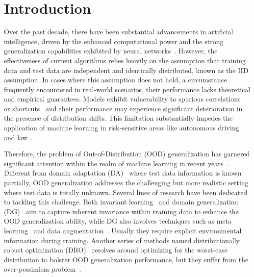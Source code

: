 \section{Introduction}

Over the past decade, there have been substantial advancements in artificial intelligence, driven by the enhanced computational power and the strong generalization capabilities exhibited by neural networks~\cite{he2016deep, brown2020language}. 
However, the effectiveness of current algorithms relies heavily on the assumption that training data and test data are independent and identically distributed, known as the IID assumption. In cases where this assumption does not hold, a circumstance frequently encountered in real-world scenarios, their performance lacks theoretical and empirical guarantees. Models exhibit vulnerability to spurious correlations~\cite{sagawa2020investigation} or shortcuts~\cite{geirhos2020shortcut} and their performance may experience significant deterioration in the presence of distribution shifts. This limitation substantially impedes the application of machine learning in risk-sensitive areas like autonomous driving~\cite{muhammad2020deep} and law~\cite{surden2014machine}. 

Therefore, the problem of Out-of-Distribution (OOD) generalization has garnered significant attention within the realm of machine learning in recent years~\cite{shen2021towards}. Different from domain adaptation (DA)~\cite{ben2006analysis,long2015learning, chu2016selective} where test data information is known partially, OOD generalization addresses the challenging but more realistic setting where test data is totally unknown. 
Several lines of research have been dedicated to tackling this challenge. 
Both invariant learning~\cite{arjovsky2019invariant, krueger2021out} and domain generalization (DG)~\cite{shankar2018generalizing, rame2022fishr} aim to capture inherent invariance within training data to enhance the OOD generalization ability, while DG also involves techniques such as meta learning~\cite{li2018learning} and data augmentation~\cite{zhou2020domain}. Usually they require explicit environmental information during training.  
Another series of methods named distributionally robust optimization (DRO)~\cite{volpi2018generalizing, duchi2021learning} resolves around optimizing for the worst-case distribution to bolster OOD generalization performance, but they suffer from the over-pessimism problem~\cite{liu2022distributionally}. 

